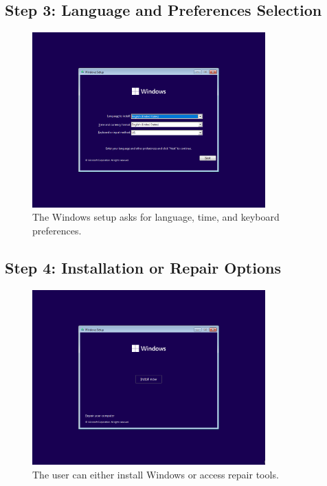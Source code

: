 \documentclass{article}
\begin{document}
\subsection{Step 3: Language and Preferences Selection}
\begin{figure}[H]
    \centering
    \includegraphics[width=0.8\textwidth]{2024-09-17_13-49-51.png}
    \caption{The Windows setup asks for language, time, and keyboard preferences.}
\end{figure}

\subsection{Step 4: Installation or Repair Options}
\begin{figure}[H]
    \centering
    \includegraphics[width=0.8\textwidth]{2024-09-17_13-50-15.png}
    \caption{The user can either install Windows or access repair tools.}
\end{figure}
\end{document}
